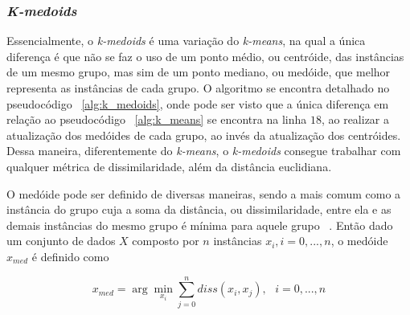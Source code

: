\subsubsection{\emph{K-medoids}}

Essencialmente, o \emph{k-medoids} é uma variação do \emph{k-means}, na qual a única diferença é que não se faz o uso de um ponto médio, ou centróide, das instâncias de um mesmo grupo, mas sim de um ponto mediano, ou medóide, que melhor representa as instâncias de cada grupo. O algoritmo se encontra detalhado no pseudocódigo ~\ref{alg:k_medoids}, onde pode ser visto que a única diferença em relação ao pseudocódigo ~\ref{alg:k_means} se encontra na linha $18$, ao realizar a atualização dos medóides de cada grupo, ao invés da atualização dos centróides.  Dessa maneira, diferentemente do \emph{k-means}, o \emph{k-medoids} consegue trabalhar com qualquer métrica de dissimilaridade, além da distância euclidiana.

O medóide pode ser definido de diversas maneiras, sendo a mais comum como a instância do grupo cuja a soma da distância, ou dissimilaridade, entre ela e as demais instâncias do  mesmo grupo é mínima para aquele grupo ~\parencite[][253]{Ullman}. Então dado um conjunto de dados $X$ composto por $n$ instâncias $x_i, i=0,...,n$, o medóide $x_{med}$ é definido como

\begin{equation}
x_{med} = \arg \min_{x_i} \sum_{j=0}^{n} diss(x_i,x_j), \text{			}i=0,...,n
\end{equation}


